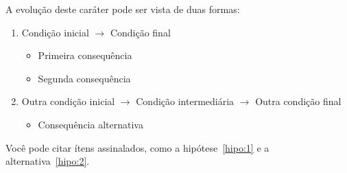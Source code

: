 A evolução deste caráter pode ser vista de duas formas:

\begin{enumerate}
  \item{Condição inicial $\longrightarrow$ Condição final}\label{hipo:1}
    \begin{itemize}
      \item{Primeira consequência}
      \item{Segunda consequência}
    \end{itemize}
  \item{Outra condição inicial $\longrightarrow$ Condição intermediária $\longrightarrow$ Outra condição final}\label{hipo:2}
    \begin{itemize}
      \item{Consequência alternativa}
    \end{itemize}
\end{enumerate}

Você pode citar ítens assinalados, como a hipótese~\ref{hipo:1} e a alternativa~\ref{hipo:2}.
